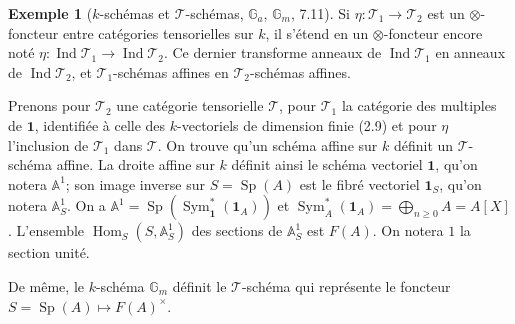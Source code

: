 \documentclass[12pt,a4paper]{article}
\theoremstyle{plain}
\theoremstyle{definition}
\newtheorem{example}[theorem]{Exemple}
\DeclareMathOperator{\Sp}{Sp}
\DeclareMathOperator{\Hom}{Hom}
\DeclareMathOperator{\Sym}{Sym}
\DeclareMathOperator{\Ind}{Ind}
\begin{document}
\begin{example}[$k$-schémas et $\mathcal{T}$-schémas, $\mathbb{G}_a$, $\mathbb{G}_m$, 7.11]
Si $\eta : \mathcal{T}_1 \to \mathcal{T}_2$ est un $\otimes$-foncteur entre catégories tensorielles sur $k$, il s'étend en un $\otimes$-foncteur encore noté $\eta : \Ind\mathcal{T}_1 \to \Ind\mathcal{T}_2$. Ce dernier transforme anneaux de $\Ind\mathcal{T}_1$ en anneaux de $\Ind\mathcal{T}_2$, et $\mathcal{T}_1$-schémas affines en $\mathcal{T}_2$-schémas affines.

Prenons pour $\mathcal{T}_2$ une catégorie tensorielle $\mathcal{T}$, pour $\mathcal{T}_1$ la catégorie des multiples de $\mathbf{1}$, identifiée à celle des $k$-vectoriels de dimension finie (2.9) et pour $\eta$ l'inclusion de $\mathcal{T}_1$ dans $\mathcal{T}$. On trouve qu'un schéma affine sur $k$ définit un $\mathcal{T}$-schéma affine. La droite affine sur $k$ définit ainsi le schéma vectoriel $\mathbf{1}$, qu'on notera $\mathbb{A}^1$; son image inverse sur $S = \Sp(A)$ est le fibré vectoriel $\mathbf{1}_S$, qu'on notera $\mathbb{A}^1_S$. On a $\mathbb{A}^1 = \Sp(\Sym^*_\mathbf{1}(\mathbf{1}_A))$ et $\Sym^*_A(\mathbf{1}_A) = \bigoplus_{n \geq 0} A = A[X]$. L'ensemble $\Hom_S(S, \mathbb{A}^1_S)$ des sections de $\mathbb{A}^1_S$ est $F(A)$. On notera $1$ la section unité.

De même, le $k$-schéma $\mathbb{G}_m$ définit le $\mathcal{T}$-schéma qui représente le foncteur $S = \Sp(A) \mapsto F(A)^\times$.
\end{example}
\end{document}
